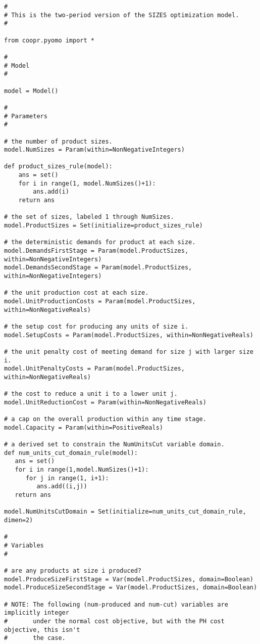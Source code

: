 {\small
\begin{verbatim}
#
# This is the two-period version of the SIZES optimization model.
#

from coopr.pyomo import *

#
# Model
#

model = Model()

#
# Parameters
#

# the number of product sizes.
model.NumSizes = Param(within=NonNegativeIntegers)

def product_sizes_rule(model):
    ans = set()
    for i in range(1, model.NumSizes()+1):
        ans.add(i)
    return ans

# the set of sizes, labeled 1 through NumSizes.
model.ProductSizes = Set(initialize=product_sizes_rule)

# the deterministic demands for product at each size.
model.DemandsFirstStage = Param(model.ProductSizes, within=NonNegativeIntegers)
model.DemandsSecondStage = Param(model.ProductSizes, within=NonNegativeIntegers)

# the unit production cost at each size.
model.UnitProductionCosts = Param(model.ProductSizes, within=NonNegativeReals)

# the setup cost for producing any units of size i.
model.SetupCosts = Param(model.ProductSizes, within=NonNegativeReals)

# the unit penalty cost of meeting demand for size j with larger size i.
model.UnitPenaltyCosts = Param(model.ProductSizes, within=NonNegativeReals)

# the cost to reduce a unit i to a lower unit j.
model.UnitReductionCost = Param(within=NonNegativeReals)

# a cap on the overall production within any time stage.
model.Capacity = Param(within=PositiveReals)

# a derived set to constrain the NumUnitsCut variable domain.
def num_units_cut_domain_rule(model):
   ans = set()
   for i in range(1,model.NumSizes()+1):
      for j in range(1, i+1):
         ans.add((i,j))    
   return ans

model.NumUnitsCutDomain = Set(initialize=num_units_cut_domain_rule, dimen=2)

#
# Variables
#

# are any products at size i produced?
model.ProduceSizeFirstStage = Var(model.ProductSizes, domain=Boolean)
model.ProduceSizeSecondStage = Var(model.ProductSizes, domain=Boolean)

# NOTE: The following (num-produced and num-cut) variables are implicitly integer
#       under the normal cost objective, but with the PH cost objective, this isn't
#       the case.


\end{verbatim}}
